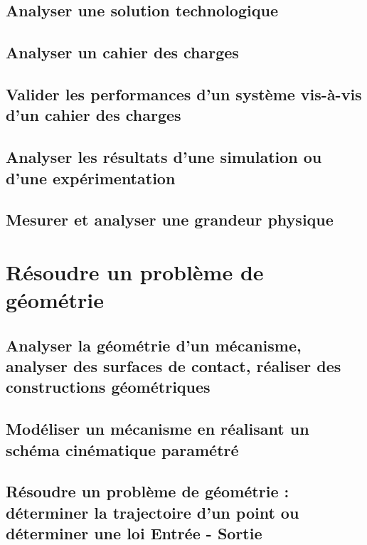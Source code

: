 \section{Analyser une solution technologique} 
\section{Analyser un cahier des charges} 
\section{Valider les performances d'un système vis-à-vis d'un cahier des charges} 
\section{Analyser les résultats d'une simulation ou d'une expérimentation} 
\section{Mesurer et analyser une grandeur physique} 
\setchapterpreamble[u]{\margintoc} 
\chapter{Résoudre un problème de géométrie} 
\section{Analyser la géométrie d'un mécanisme, analyser des surfaces de contact, réaliser des constructions géométriques} 
\section{Modéliser un mécanisme en réalisant un schéma cinématique paramétré} 
\section{Résoudre un problème de géométrie : déterminer la trajectoire d'un point ou déterminer une loi Entrée - Sortie} 
\graphicspath{{\repStyle/png/}{../GEO/GEO-03/10_PompePalette/images/}} 
 
 
\graphicspath{{\repStyle/png/}{../GEO/GEO-03/11_PompePistonsRadiaux/images/}} 
 
 
\graphicspath{{\repStyle/png/}{../GEO/GEO-03/12_BielleManivelle/images/}} 
 
 
